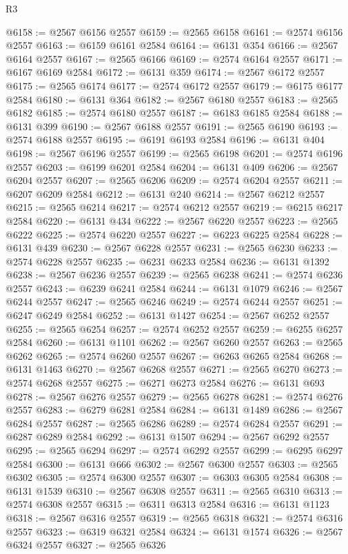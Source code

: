 \begin{lexlean}{R3}
\begin{coremodule}
@6158 := @2567 @6156 @2557
@6159 := @2565 @6158
@6161 := @2574 @6156 @2557
@6163 := @6159 @6161 @2584
@6164 := @6131 @354
@6166 := @2567 @6164 @2557
@6167 := @2565 @6166
@6169 := @2574 @6164 @2557
@6171 := @6167 @6169 @2584
@6172 := @6131 @359
@6174 := @2567 @6172 @2557
@6175 := @2565 @6174
@6177 := @2574 @6172 @2557
@6179 := @6175 @6177 @2584
@6180 := @6131 @364
@6182 := @2567 @6180 @2557
@6183 := @2565 @6182
@6185 := @2574 @6180 @2557
@6187 := @6183 @6185 @2584
@6188 := @6131 @399
@6190 := @2567 @6188 @2557
@6191 := @2565 @6190
@6193 := @2574 @6188 @2557
@6195 := @6191 @6193 @2584
@6196 := @6131 @404
@6198 := @2567 @6196 @2557
@6199 := @2565 @6198
@6201 := @2574 @6196 @2557
@6203 := @6199 @6201 @2584
@6204 := @6131 @409
@6206 := @2567 @6204 @2557
@6207 := @2565 @6206
@6209 := @2574 @6204 @2557
@6211 := @6207 @6209 @2584
@6212 := @6131 @240
@6214 := @2567 @6212 @2557
@6215 := @2565 @6214
@6217 := @2574 @6212 @2557
@6219 := @6215 @6217 @2584
@6220 := @6131 @434
@6222 := @2567 @6220 @2557
@6223 := @2565 @6222
@6225 := @2574 @6220 @2557
@6227 := @6223 @6225 @2584
@6228 := @6131 @439
@6230 := @2567 @6228 @2557
@6231 := @2565 @6230
@6233 := @2574 @6228 @2557
@6235 := @6231 @6233 @2584
@6236 := @6131 @1392
@6238 := @2567 @6236 @2557
@6239 := @2565 @6238
@6241 := @2574 @6236 @2557
@6243 := @6239 @6241 @2584
@6244 := @6131 @1079
@6246 := @2567 @6244 @2557
@6247 := @2565 @6246
@6249 := @2574 @6244 @2557
@6251 := @6247 @6249 @2584
@6252 := @6131 @1427
@6254 := @2567 @6252 @2557
@6255 := @2565 @6254
@6257 := @2574 @6252 @2557
@6259 := @6255 @6257 @2584
@6260 := @6131 @1101
@6262 := @2567 @6260 @2557
@6263 := @2565 @6262
@6265 := @2574 @6260 @2557
@6267 := @6263 @6265 @2584
@6268 := @6131 @1463
@6270 := @2567 @6268 @2557
@6271 := @2565 @6270
@6273 := @2574 @6268 @2557
@6275 := @6271 @6273 @2584
@6276 := @6131 @693
@6278 := @2567 @6276 @2557
@6279 := @2565 @6278
@6281 := @2574 @6276 @2557
@6283 := @6279 @6281 @2584
@6284 := @6131 @1489
@6286 := @2567 @6284 @2557
@6287 := @2565 @6286
@6289 := @2574 @6284 @2557
@6291 := @6287 @6289 @2584
@6292 := @6131 @1507
@6294 := @2567 @6292 @2557
@6295 := @2565 @6294
@6297 := @2574 @6292 @2557
@6299 := @6295 @6297 @2584
@6300 := @6131 @666
@6302 := @2567 @6300 @2557
@6303 := @2565 @6302
@6305 := @2574 @6300 @2557
@6307 := @6303 @6305 @2584
@6308 := @6131 @1539
@6310 := @2567 @6308 @2557
@6311 := @2565 @6310
@6313 := @2574 @6308 @2557
@6315 := @6311 @6313 @2584
@6316 := @6131 @1123
@6318 := @2567 @6316 @2557
@6319 := @2565 @6318
@6321 := @2574 @6316 @2557
@6323 := @6319 @6321 @2584
@6324 := @6131 @1574
@6326 := @2567 @6324 @2557
@6327 := @2565 @6326

\end{coremodule}
\end{lexlean}
